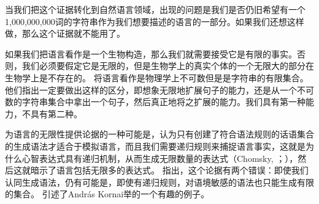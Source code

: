 当我们把这个证据转化到自然语言领域，出现的问题是我们是否仍旧希望有一个1,000,000,000词的字符串作为我们想要描述的语言的一部分。如果我们还想这样做，那么这个证据就不能用了。

如果我们把语言看作是一个生物构造，那么我们就需要接受它是有限的事实。否则，我们必须要假定它是无限的，但是生物学上的真实个体的一个无限大的部分在生物学上是不存在的\citep[]{Postal2009a}。 \citet{LL2011a}将语言看作是物理学上不可数但是是字符串的有限集合。他们指出一定要做出这样的区分，即想象无限地扩展句子的能力，还是从一个不可数的字符串集合中拿出一个句子，然后真正地将之扩展的能力。我们具有第一种能力，不具有第二种。

为语言的无限性提供论据的一种可能是，认为只有创建了符合语法规则的话语集合的生成语法才适合于模拟语言，而且我们需要递归规则来捕捉语言事实，这就是为什么心智表达式具有递归机制，从而生成无限数量的表达式（Chomsky, \citeyear[]{Chomsky56a-u}；\citeyear[--87]{Chomsky2002a-u}），然后这就暗示了语言包括无限多的表达式。 \citet{PS2010a}指出，这个论据有两个错误：即使我们认同生成语法，仍有可能是，即使有递归规则，对语境敏感的语法也只能生成有限的集合。 \citet[120--121]{PS2010a}引述了Andr{\'a}s Kornai举的一个有趣的例子。


